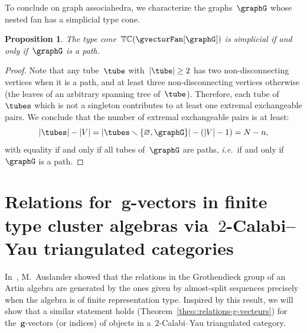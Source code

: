 \documentclass{amsart}
\newtheorem{proposition}[theorem]{Proposition}
\theoremstyle{definition}
\renewcommand{\b}[1]{{\boldsymbol{#1}}} %
\newcommand{\ssm}{\smallsetminus} %
\newcommand{\ie}{\textit{i.e.}~} %
\newcommand{\typeCone}{\mathbb{TC}} %
\begin{document}
To conclude on graph associahedra, we characterize the graphs~$\graphG$ whose nested fan has a simplicial type cone.

\begin{proposition}
The type cone~$\typeCone(\gvectorFan[\graphG])$ is simplicial if and only if~$\graphG$ is a path.
\end{proposition}

\begin{proof}
Note that any tube~$\tube$ with~$|\tube| \ge 2$ has two non-disconnecting vertices when it is a path, and at least three non-disconnecting vertices otherwise (the leaves of an arbitrary spanning tree of~$\tube$).
Therefore, each tube of~$\tubes$ which is not a singleton contributes to at least one extremal exchangeable pairs.
We conclude that the number of extremal exchangeable pairs is at least:
\[
|\tubes| - |V| = |\tubes \ssm \{\varnothing, \graphG\}| - (|V|-1) = N - n,
\]
with equality if and only if all tubes of~$\graphG$ are paths, \ie if and only if~$\graphG$ is a path.
\end{proof}



\section{Relations for~$\b{g}$-vectors in finite type cluster algebras via~$2$-Calabi--Yau triangulated categories}
\label{sec:clusterCategories}

In~\cite{Auslander1984}, M.~Auslander showed that the relations in the Grothendieck group of an Artin algebra are generated by the ones given by almost-split sequences precisely when the algebra is of finite representation type.  Inspired by this result, we will show that a similar statement holds (Theorem~\ref{theo::relations-g-vecteurs}) for the~$\b g$-vectors (or indices) of objects in a~$2$-Calabi--Yau triangulated category. 
\end{document}

